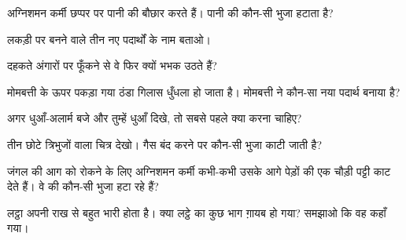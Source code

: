 \begin{exercise}[$\star$]\label{exo:g4:what-a-fire-needs:4}
अग्निशमन कर्मी  छप्पर पर पानी की बौछार करते हैं। पानी  की
कौन-सी भुजा हटाता है?
\end{exercise}

\begin{exercise}[$\star$]\label{exo:g4:what-a-fire-needs:5}
लकड़ी  पर बनने वाले तीन नए पदार्थों के नाम बताओ।
\end{exercise}

\begin{exercise}[$\star$]\label{exo:g4:what-a-fire-needs:6}
दहकते अंगारों पर फूँकने से वे फिर क्यों भभक उठते हैं?
\end{exercise}

\begin{exercise}[$\star$]\label{exo:g4:what-a-fire-needs:7}
मोमबत्ती के ऊपर पकड़ा गया ठंडा गिलास धुँधला हो जाता है। मोमबत्ती ने कौन-सा
नया पदार्थ बनाया है?
\end{exercise}

\begin{exercise}[$\star$]\label{exo:g4:what-a-fire-needs:8}
अगर धुआँ-अलार्म बजे और तुम्हें धुआँ दिखे, तो सबसे पहले क्या करना चाहिए?
\end{exercise}

\begin{exercise}[$\star$]\label{exo:g4:what-a-fire-needs:9}
तीन छोटे त्रिभुजों वाला चित्र देखो। गैस बंद करने पर कौन-सी भुजा काटी
जाती है?
\end{exercise}

\begin{exercise}[$\star\star$]\label{exo:g4:what-a-fire-needs:10}
जंगल की आग को रोकने के लिए अग्निशमन कर्मी कभी-कभी उसके आगे पेड़ों की एक
चौड़ी पट्टी काट देते हैं। वे  की कौन-सी भुजा हटा
रहे हैं?
\end{exercise}

\begin{exercise}[$\star\star$]\label{exo:g4:what-a-fire-needs:11}
लट्ठा अपनी राख से बहुत भारी होता है। क्या लट्ठे का कुछ भाग ग़ायब हो गया?
समझाओ कि वह कहाँ गया।
\end{exercise}
